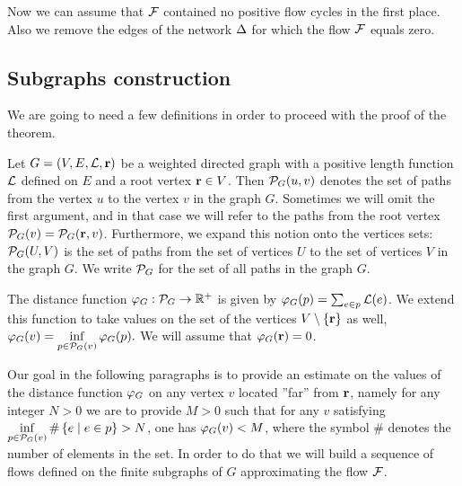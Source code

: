 \documentclass[12pt,oneside,a4paper]{amsart}
\begin{document}
        Now we can assume that $\flowpos$ contained no positive flow cycles in the first place.
        Also we remove the edges of the network $\net$ for which the flow $\flowpos$ equals zero.

      \medskip
      \subsection{Subgraphs construction}
        We are going to need a few definitions in order to proceed with the proof of the theorem.
        \begin{definition}
          Let $G = (V, E,\len, \root)$ be a weighted directed graph with a positive
            length function $\len$ defined on $E$ and a root vertex $\root \in V$.
          Then $\gpaths(u, v)$ denotes the set of paths from the vertex $u$ to the vertex $v$ in the graph $G$.
          Sometimes we will omit the first argument, and in that case we will refer to the paths from the root vertex
            $\gpaths(v) = \gpaths(\root, v)$.
          Furthermore, we expand this notion onto the vertices sets: $\gpaths(U,V)$ is the set of paths
            from the set of vertices $U$ to the set of vertices $V$ in the graph $G$.
          We write $\gpaths$ for the set of all paths in the graph $G$.
        \end{definition}
        \begin{definition}
          \label{def-dist-fun}
          The distance function $\gfi: \gpaths \to \mathbb{R}^{+}$ is given by $\gfi(p) = \sum_{e \in p} \len(e)$.
          We extend this function to take values on the set of the vertices $V \setminus \{\root\}$ as well,
            $\gfi(v) = \displaystyle\inf_{p \in \gpaths(v)} \gfi(p).$
          We will assume that $\gfi(\root) = 0$.
        \end{definition}

        Our goal in the following paragraphs is to provide an estimate on the values of the distance function $\gfi$ on any vertex $v$
          located ''far'' from $\root$, namely for any integer $N > 0$ we are to provide $M > 0$ such that
          for any $v$ satisfying $\displaystyle\inf_{p \in \gpaths(v)} \#\left\{ e \mid e \in p\right\} > N$,
          one has $\gfi(v) < M$, where the symbol $\#$ denotes the number of elements in the set.
        In order to do that we will build a sequence of flows defined
          on the finite subgraphs of $G$ approximating the flow $\cal{F}$.
\end{document}
